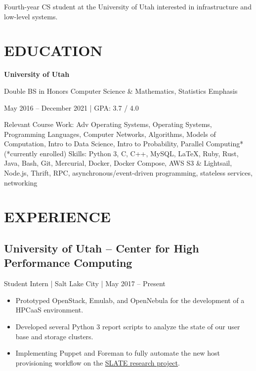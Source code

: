 \documentclass[10pt, letterpaper]{resume}
\begin{document}
\maketitle

{\centering
 Fourth-year CS student at the University of Utah interested in infrastructure and low-level systems.
 \par
}

\section{EDUCATION}
 {\centering
  \textbf{University of Utah}

  Double BS in Honors Computer Science \& Mathematics, Statistics Emphasis

  May 2016 -- December 2021 | GPA: 3.7 / 4.0
  \par
 }
\vspace{10pt}
{{\selectfont Relevant Course Work:}
 Adv Operating Systems, Operating Systems, Programming Languages, Computer Networks, Algorithms, Models of Computation, Intro to Data Science, Intro to Probability, Parallel Computing* {\footnotesize(*currently enrolled)}}
\smallbreak
{{\selectfont Skills:} Python 3, C, C++, MySQL, \LaTeX, Ruby, Rust, Java, Bash, Git, Mercurial, Docker, Docker Compose, AWS S3 \& Lightsail, Node.js, Thrift, RPC, asynchronous/event-driven programming, stateless services, networking}

\section{EXPERIENCE}
\subsection{University of Utah -- Center for High Performance Computing}
Student Intern | Salt Lake City | May 2017 -- Present
\begin{itemize}
 \item Prototyped OpenStack, Emulab, and OpenNebula for the development of a HPCaaS environment.
 \item Developed several Python 3 report scripts to analyze the state of our user base and storage clusters.
 \item Implementing Puppet and Foreman to fully automate the new host provisioning workflow on the \href{https://slateci.io}{SLATE research project}.
\end{itemize}
\end{document}
